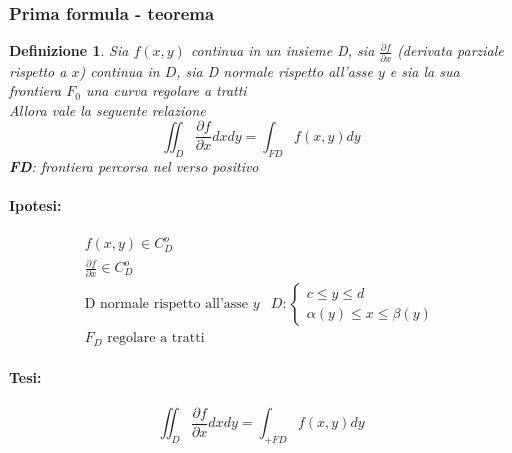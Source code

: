 \documentclass{book}
\newtheorem{defi}{Definizione}
\begin{document}
\subsubsection{Prima formula - teorema}
\begin{defi}
	Sia $f(x,y)$ continua in un insieme D, sia $\frac{\partial f}{\partial x}$
	(derivata parziale rispetto a $x$) continua in $D$, sia D normale rispetto all'asse
	$y$ e sia la sua frontiera $F_0$ una curva regolare a tratti\\
	Allora vale la seguente relazione 
	\begin{equation*}
		\iint_{D}\frac{\partial f}{\partial x} dxdy=\int_{FD} f(x,y)dy
	\end{equation*}
	\textbf{FD}: frontiera percorsa nel verso positivo 
	\begin{multicols}{2}
		\paragraph{Ipotesi:}
		\begin{equation*}
			\begin{matrix}
				f(x,y)\in C^o_D\\
				\frac{\partial f}{\partial x}\in C_D^o\\
					\text{D normale rispetto all'asse }y & D: \begin{cases}
						c\leq y\leq d\\
						\alpha (y) \leq x \leq \beta (y)
					\end{cases}\\
					F_D \text{ regolare a tratti}
			\end{matrix}
		\end{equation*}
		\paragraph{Tesi:}
		\begin{equation*}
			\displaystyle\iint_D \frac{\partial f}{\partial x} dxdy=\int_{+FD}
			f(x,y)dy
		\end{equation*}
	\end{multicols}
\end{defi}
\end{document}
